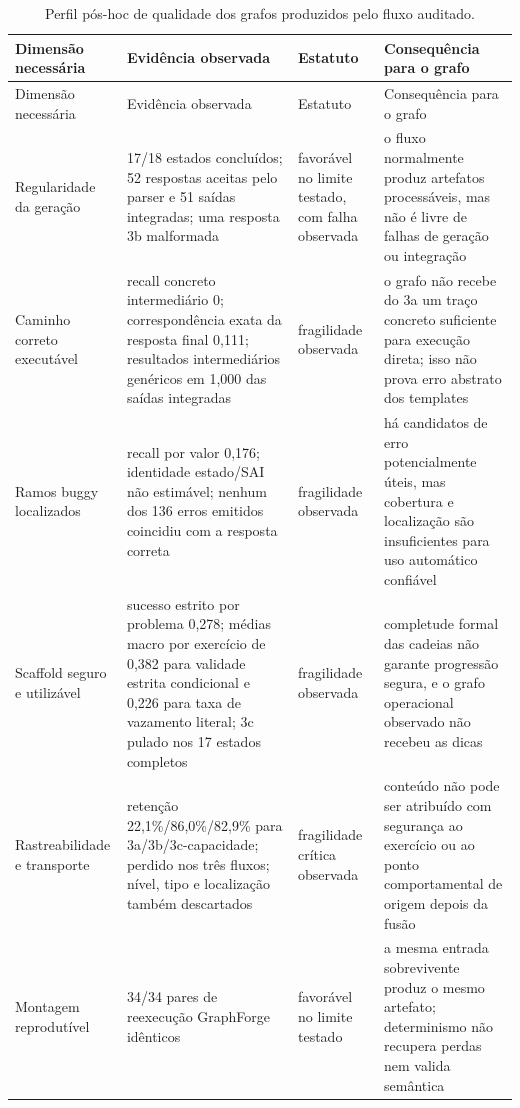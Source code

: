 \documentclass[11pt,a4paper]{article}
\begin{document}
\begingroup
\small
\setlength{\tabcolsep}{3pt}
\begin{longtable}{@{}P{2.65cm}P{4.55cm}P{3.15cm}P{4.15cm}@{}}
\caption{Perfil pós-hoc de qualidade dos grafos produzidos pelo fluxo auditado.}\label{tab:quality-verdict}\\
\toprule
Dimensão necessária & Evidência observada & Estatuto & Consequência para o grafo \\
\midrule
\endfirsthead
\toprule
Dimensão necessária & Evidência observada & Estatuto & Consequência para o grafo \\
\midrule
\endhead
Regularidade da geração & 17/18 estados concluídos; 52 respostas aceitas pelo parser e 51 saídas integradas; uma resposta 3b malformada & favorável no limite testado, com falha observada & o fluxo normalmente produz artefatos processáveis, mas não é livre de falhas de geração ou integração \\
Caminho correto executável & recall concreto intermediário 0; correspondência exata da resposta final 0,111; resultados intermediários genéricos em 1,000 das saídas integradas & fragilidade observada & o grafo não recebe do 3a um traço concreto suficiente para execução direta; isso não prova erro abstrato dos templates \\
Ramos buggy localizados & recall por valor 0,176; identidade estado/SAI não estimável; nenhum dos 136 erros emitidos coincidiu com a resposta correta & fragilidade observada & há candidatos de erro potencialmente úteis, mas cobertura e localização são insuficientes para uso automático confiável \\
Scaffold seguro e utilizável & sucesso estrito por problema 0,278; médias macro por exercício de 0,382 para validade estrita condicional e 0,226 para taxa de vazamento literal; 3c pulado nos 17 estados completos & fragilidade observada & completude formal das cadeias não garante progressão segura, e o grafo operacional observado não recebeu as dicas \\
Rastreabilidade e transporte & retenção 22,1\%/86,0\%/82,9\% para 3a/3b/3c-capacidade;  perdido nos três fluxos; nível, tipo e localização também descartados & fragilidade crítica observada & conteúdo não pode ser atribuído com segurança ao exercício ou ao ponto comportamental de origem depois da fusão \\
Montagem reprodutível & 34/34 pares de reexecução GraphForge idênticos & favorável no limite testado & a mesma entrada sobrevivente produz o mesmo artefato; determinismo não recupera perdas nem valida semântica \\

\end{longtable}
\end{document}
